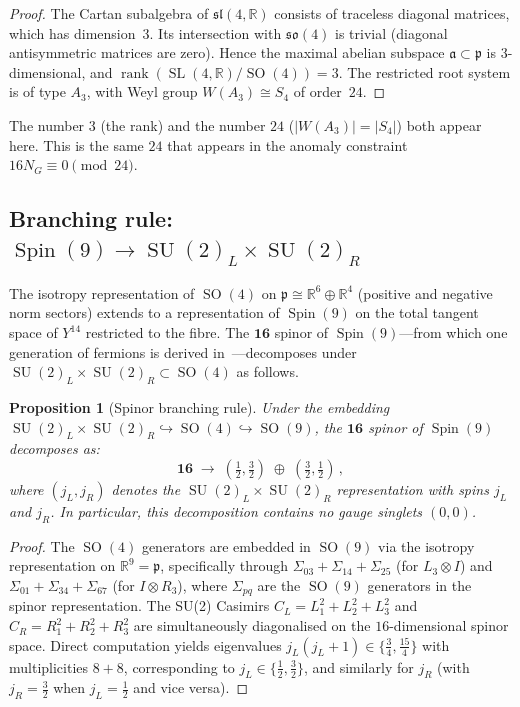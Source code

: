\documentclass[12pt,a4paper]{article}
\newtheorem{proposition}[theorem]{Proposition}
\theoremstyle{definition}
\newcommand{\SO}{\operatorname{SO}}
\newcommand{\SU}{\operatorname{SU}}
\newcommand{\Spin}{\operatorname{Spin}}
\newcommand{\SL}{\operatorname{SL}}
\newcommand{\R}{\mathbb{R}}
\begin{document}
\begin{proof}
The Cartan subalgebra of $\mathfrak{sl}(4,\R)$ consists of traceless diagonal matrices, which has dimension~$3$.
Its intersection with $\mathfrak{so}(4)$ is trivial (diagonal antisymmetric matrices are zero).
Hence the maximal abelian subspace $\mathfrak{a} \subset \mathfrak{p}$ is $3$-dimensional, and $\operatorname{rank}(\SL(4,\R)/\SO(4)) = 3$.
The restricted root system is of type $A_3$, with Weyl group $W(A_3) \cong S_4$ of order~$24$.
\end{proof}

The number $3$ (the rank) and the number $24$ ($|W(A_3)| = |S_4|$) both appear here.
This is the same $24$ that appears in the anomaly constraint $16 N_G \equiv 0 \pmod{24}$.

\subsection{Branching rule: \texorpdfstring{$\Spin(9) \to \SU(2)_L \times \SU(2)_R$}{Spin(9) -> SU(2)L x SU(2)R}}

The isotropy representation of $\SO(4)$ on $\mathfrak{p} \cong \R^{6} \oplus \R^{4}$ (positive and negative norm sectors) extends to a representation of $\Spin(9)$ on the total tangent space of $Y^{14}$ restricted to the fibre.
The $\mathbf{16}$ spinor of $\Spin(9)$---from which one generation of fermions is derived in~\cite{Paper2}---decomposes under $\SU(2)_L \times \SU(2)_R \subset \SO(4)$ as follows.

\begin{proposition}[Spinor branching rule]
\label{prop:branching}
Under the embedding $\SU(2)_L \times \SU(2)_R \hookrightarrow \SO(4) \hookrightarrow \SO(9)$, the $\mathbf{16}$ spinor of $\Spin(9)$ decomposes as:
\begin{equation}
\mathbf{16} \;\to\; (\tfrac{1}{2}, \tfrac{3}{2}) \;\oplus\; (\tfrac{3}{2}, \tfrac{1}{2})\,,
\end{equation}
where $(j_L, j_R)$ denotes the $\SU(2)_L \times \SU(2)_R$ representation with spins $j_L$ and $j_R$.
In particular, this decomposition contains \emph{no gauge singlets} $(0,0)$.
\end{proposition}

\begin{proof}
The $\SO(4)$ generators are embedded in $\SO(9)$ via the isotropy representation on $\R^9 = \mathfrak{p}$, specifically through $\Sigma_{03} + \Sigma_{14} + \Sigma_{25}$ (for $L_3 \otimes I$) and $\Sigma_{01} + \Sigma_{34} + \Sigma_{67}$ (for $I \otimes R_3$), where $\Sigma_{pq}$ are the $\SO(9)$ generators in the spinor representation.
The SU(2) Casimirs $C_L = L_1^2 + L_2^2 + L_3^2$ and $C_R = R_1^2 + R_2^2 + R_3^2$ are simultaneously diagonalised on the $16$-dimensional spinor space.
Direct computation yields eigenvalues $j_L(j_L+1) \in \{\tfrac{3}{4}, \tfrac{15}{4}\}$ with multiplicities $8 + 8$, corresponding to $j_L \in \{\tfrac{1}{2}, \tfrac{3}{2}\}$, and similarly for $j_R$ (with $j_R = \tfrac{3}{2}$ when $j_L = \tfrac{1}{2}$ and vice versa).
\end{proof}
\end{document}
